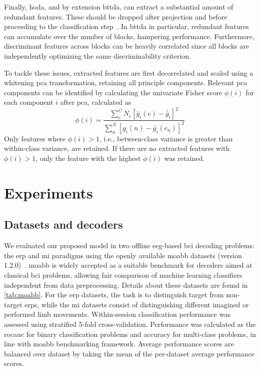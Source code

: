 \documentclass[twocolumn]{article}
\begin{document}
Finally, \ac{hoda}, and by extension \ac{bttda}, can extract a substantial amount
of redundant features.
These should be dropped after projection and before proceeding to the classification
step~\cite{Phan2010}.
In \ac{bttda} in particular, redundant features can accumulate over the number of
blocks, hampering performance.
Furthermore, discriminant features across blocks can be heavily correlated since
all blocks are independently optimizing the same discriminability criterion.

To tackle these issues, extracted features are first decorrelated and scaled using
a whitening \ac{pca} transformation, retaining all principle components.
Relevant \ac{pca} components can be identified by calculating the
univariate Fisher score $\phi(i)$ for each component $i$ after \ac{pca},
calculated as
\begin{equation}
	\phi(i) = \frac
	{\sum_c^C N_c \left[\bar{g}_i(c)-\bar{\bar{g}}_i\right]^2}
	{\sum_n^N \left[g_i(n)-\bar{g}_i(c_n)\right]^2}
\end{equation}
Only features where $\phi(i) > 1$, i.e., between-class variance is greater
than within-class variance, are retained.
If there  are no extracted features with $\phi(i) > 1$, only the feature with the highest
$\phi(i)$ was retained.

\section{Experiments}
\subsection{Datasets and decoders}
We evaluated our proposed model in two offline \ac{eeg}-based \ac{bci} decoding problems:
the \acf{erp} and \acf{mi} paradigms using the openly available \ac{moabb} datasets
(version 1.2.0)~\cite{Aristimunha2023}.
\Ac{moabb} is widely accepted as a suitable benchmark for decoders aimed at
classical \ac{bci} problems, allowing fair comparison of machine learning classifiers
independent from data preprocessing.
Details about these datasets are found in \cref{tab:moabb}.
For the \ac{erp} datasets, the task is to distinguish target from non-target \acp{erp},
while the \ac{mi} datasets consist of distinguishing different imagined or performed
limb movements.
Within-session classification performance was assessed using stratified 5-fold
cross-validation. Performance was calculated as the \ac{rocauc} for binary
classification problems and accuracy for multi-class problems, in line with
\ac{moabb} benchmarking framework.
Average performance scores are balanced over dataset by taking the mean of
the per-dataset average performance scores.
\end{document}
